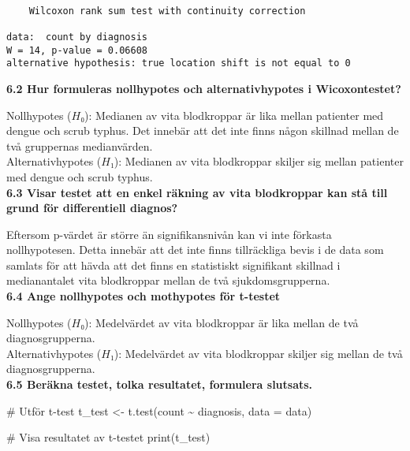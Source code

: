 \documentclass[
  letterpaper,
  DIV=11,
  numbers=noendperiod]{scrartcl}
\newenvironment{Shaded}{\begin{snugshade}}{\end{snugshade}}
\newcommand{\AttributeTok}[1]{\textcolor[rgb]{0.40,0.45,0.13}{#1}}
\newcommand{\CommentTok}[1]{\textcolor[rgb]{0.37,0.37,0.37}{#1}}
\newcommand{\FunctionTok}[1]{\textcolor[rgb]{0.28,0.35,0.67}{#1}}
\newcommand{\NormalTok}[1]{\textcolor[rgb]{0.00,0.23,0.31}{#1}}
\newcommand{\OtherTok}[1]{\textcolor[rgb]{0.00,0.23,0.31}{#1}}
\newcommand{\SpecialCharTok}[1]{\textcolor[rgb]{0.37,0.37,0.37}{#1}}
\begin{document}
\begin{verbatim}

    Wilcoxon rank sum test with continuity correction

data:  count by diagnosis
W = 14, p-value = 0.06608
alternative hypothesis: true location shift is not equal to 0
\end{verbatim}

\textbf{6.2 Hur formuleras nollhypotes och alternativhypotes i
Wicoxontestet?}

\hfill\break
Nollhypotes (\(H₀\)): Medianen av vita blodkroppar är lika mellan
patienter med dengue och scrub typhus. Det innebär att det inte finns
någon skillnad mellan de två gruppernas medianvärden.\\
Alternativhypotes (\(H₁\)): Medianen av vita blodkroppar skiljer sig
mellan patienter med dengue och scrub typhus.\\

\textbf{6.3 Visar testet att en enkel räkning av vita blodkroppar kan
stå till grund för differentiell diagnos?}

\hfill\break
Eftersom p-värdet är större än signifikansnivån kan vi inte förkasta
nollhypotesen. Detta innebär att det inte finns tillräckliga bevis i de
data som samlats för att hävda att det finns en statistiskt signifikant
skillnad i medianantalet vita blodkroppar mellan de två
sjukdomsgrupperna.\\

\textbf{6.4 Ange nollhypotes och mothypotes för t-testet}

\hfill\break
Nollhypotes (\(H₀\)): Medelvärdet av vita blodkroppar är lika mellan de
två diagnosgrupperna.\\
Alternativhypotes (\(H₁\)): Medelvärdet av vita blodkroppar skiljer sig
mellan de två diagnosgrupperna.\\

\textbf{6.5 Beräkna testet, tolka resultatet, formulera slutsats.}

\begin{Shaded}
\begin{Highlighting}[]
\CommentTok{\# Utför t{-}test}
\NormalTok{t\_test }\OtherTok{\textless{}{-}} \FunctionTok{t.test}\NormalTok{(count }\SpecialCharTok{\textasciitilde{}}\NormalTok{ diagnosis, }\AttributeTok{data =}\NormalTok{ data)}

\CommentTok{\# Visa resultatet av t{-}testet}
\FunctionTok{print}\NormalTok{(t\_test)}
\end{Highlighting}
\end{Shaded}
\end{document}

